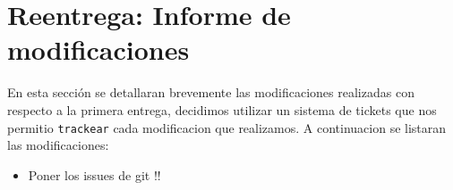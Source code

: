 \section{Reentrega: Informe de modificaciones}
En esta secci\'on se detallaran brevemente las modificaciones realizadas con respecto a la primera entrega, decidimos utilizar un sistema de tickets que nos permitio \texttt{trackear} cada modificacion que realizamos. A continuacion se listaran las modificaciones:
\begin{itemize}
	\item Poner los issues de git !!
\end{itemize}
